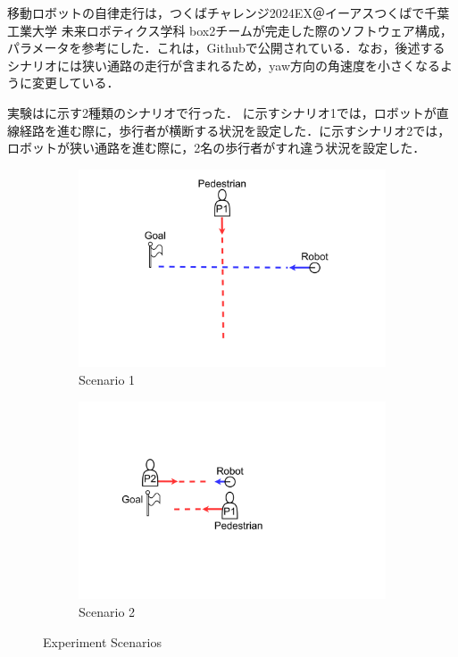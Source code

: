 移動ロボットの自律走行は，つくばチャレンジ2024EX＠イーアスつくば\cite{つくばチャレンジ36:online}で千葉工業大学 未来ロボティクス学科 box2チームが完走した際のソフトウェア構成，パラメータを参考にした．これは，Githubで公開されている\cite{openrdco85:online}．なお，後述するシナリオには狭い通路の走行が含まれるため，yaw方向の角速度を小さくなるように変更している．

\newpage

実験はに示す2種類のシナリオで行った．
に示すシナリオ1では，ロボットが直線経路を進む際に，歩行者が横断する状況を設定した．に示すシナリオ2では，ロボットが狭い通路を進む際に，2名の歩行者がすれ違う状況を設定した．

\begin{figure}[H]
  \centering
  \begin{subfigure}{0.80\textwidth}
    \centering
    \includegraphics[keepaspectratio, scale=0.15]{images/scenario1.pdf}
    \caption{Scenario 1}
    \label{Fig:scenario1}
  \end{subfigure}
  \vspace{10pt}
  \begin{subfigure}{0.80\textwidth}
    \centering
    \includegraphics[keepaspectratio, scale=0.15]{images/scenario2.pdf}
    \caption{Scenario 2}
    \label{Fig:scenario2}
  \end{subfigure}
  \caption{Experiment Scenarios}
  \label{Fig:experiment-scenarios}
\end{figure}

